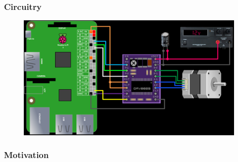 \documentclass{beamer}
\begin{document}
\begin{frame}

    \frametitle{Circuitry}

        \begin{figure}
            \centering
            \includegraphics[width=\textwidth]{connections.png}
        \end{figure}

\end{frame}

\begin{frame}

    \frametitle{Motivation}

\end{frame}
\end{document}
